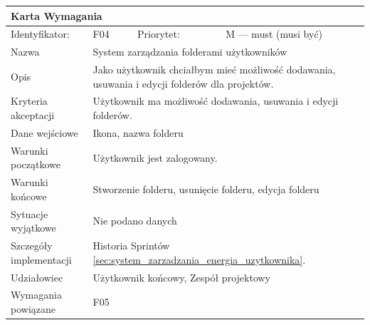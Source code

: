 \documentclass[a4paper,11pt]{report}
\begin{document}
		\begin{tabular}{|p{3cm}|p{2cm}|p{2cm}|p{6cm}|}
		\hline
		\multicolumn{4}{|p{12 cm}|}{Karta Wymagania}\\
		\hline
		Identyfikator: & F04 & Priorytet: & M — must (musi być)\\
		\hline
		Nazwa & \multicolumn{3}{|p{10 cm}|}{System zarządzania folderami użytkowników}\\
		\hline
		Opis & \multicolumn{3}{|p{10 cm}|}{Jako użytkownik chciałbym mieć możliwość dodawania, usuwania i edycji folderów dla projektów.}\\
		\hline
		Kryteria akceptacji & \multicolumn{3}{|p{10 cm}|}{Użytkownik ma możliwość dodawania, usuwania i edycji folderów.}\\
		\hline
		Dane wejściowe & \multicolumn{3}{|p{10 cm}|}{Ikona, nazwa folderu}\\
		\hline
		Warunki początkowe & \multicolumn{3}{|p{10 cm}|}{Użytkownik jest zalogowany.}\\
		\hline
		Warunki końcowe & \multicolumn{3}{|p{10 cm}|}{Stworzenie folderu, usunięcie folderu, edycja folderu}\\
		\hline
		Sytuacje wyjątkowe & \multicolumn{3}{|p{10 cm}|}{Nie podano danych}\\
		\hline
		Szczegóły implementacji & \multicolumn{3}{|p{10 cm}|}{Historia Sprintów \ref{sec:system_zarzadzania_energia_uzytkownika}.}\\
		\hline
		Udziałowiec & \multicolumn{3}{|p{10 cm}|}{Użytkownik końcowy, Zespół projektowy}\\
		\hline
		Wymagania powiązane & \multicolumn{3}{|p{10 cm}|}{F05}\\
		\hline
		\end{tabular}
		\newline
		\vspace*{0,2 cm}
		\newline
\end{document}
